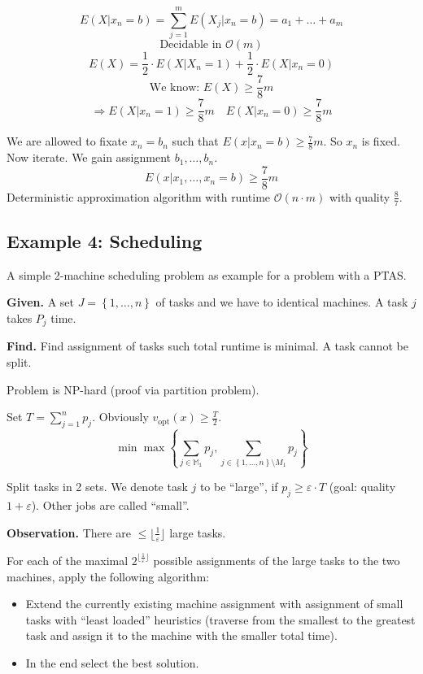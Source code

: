 \documentclass[a4paper]{article}
\newcommand{\given}[1]{\textbf{Given.} #1\par}
\newcommand{\find}[1]{\textbf{Find.} #1\par}
\newcommand{\cls}[1]{\rm{#1}}
\newcommand{\set}[1]{\left\{#1\right\}}
\newenvironment{spec}[0]{\begin{framed}}{\end{framed}}
\begin{document}
\[
  E(X|x_n = b) = \sum_{j=1}^m E(X_j | x_n = b) = a_1 + \ldots + a_m
\] \[
  \text{Decidable in } \mathcal{O}(m)
\] \[
  E(X) = \frac12 \cdot E(X | X_n = 1) + \frac12 \cdot E(X | x_n = 0)
\] \[
  \text{We know: } E(X) \geq \frac78 m
\] \[
  \Rightarrow
    E(X | x_n = 1) \geq \frac78 m  \quad
    E(X | x_n = 0) \geq \frac78 m
\]

We are allowed to fixate $x_n = b_n$ such that $E(x | x_n = b) \geq \frac78m$.
So $x_n$ is fixed. Now iterate. We gain assignment $b_1, \ldots, b_n$.
\[
  E(x | x_1, \ldots, x_n = b) \geq \frac78m
\]
Deterministic approximation algorithm with runtime $\mathcal{O}(n\cdot m)$
with quality $\frac87$.

\subsection{Example 4: Scheduling}
\label{sec:scheduling}
%
A simple 2-machine scheduling problem as example for a problem with a PTAS.

\begin{spec}
  \given{
    A set $J = \set{1, \ldots, n}$ of tasks and we have to identical machines.
    A task $j$ takes $P_j$ time.
  }
  \find{Find assignment of tasks such total runtime is minimal. A task cannot be split.}
\end{spec}

Problem is \cls{NP}-hard (proof via partition problem).

Set $T = \sum_{j=1}^n p_j$. Obviously $v_{\text{opt}}(x) \geq \frac{T}{2}$.
\[
  \min\max\set{\sum_{j \in \mathbb{M_1}} p_j,
               \sum_{j \in \set{1, \ldots, n} \setminus M_1} p_j}
\]

 Split tasks in 2 sets. We denote task $j$ to be ``large'', if
$p_j \geq \varepsilon \cdot T$ (goal: quality $1 + \varepsilon$).
Other jobs are called ``small''.

\textbf{Observation.}
  There are $\leq \lfloor \frac1{\varepsilon} \rfloor$ large tasks.

For each of the maximal $2^{\lfloor \frac1{\varepsilon} \rfloor}$ possible
assignments of the large tasks to the two machines, apply the following algorithm:
\begin{itemize}
  \item Extend the currently existing machine assignment with assignment of
        small tasks with ``least loaded'' heuristics
        (traverse from the smallest to the greatest task and assign it to
        the machine with the smaller total time).
  \item In the end select the best solution.
\end{itemize}
\end{document}
